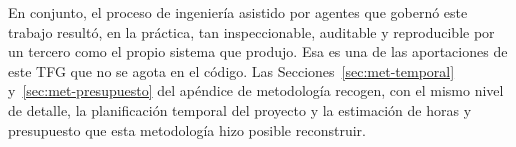 En conjunto, el proceso de ingeniería asistido por agentes que gobernó este trabajo resultó, en
la práctica, tan inspeccionable, auditable y reproducible por un tercero como el propio sistema
que produjo. Esa es una de las aportaciones de este TFG que no se agota en el código. Las
Secciones~\ref{sec:met-temporal} y~\ref{sec:met-presupuesto} del apéndice de metodología
recogen, con el mismo nivel de detalle, la planificación temporal del proyecto y la estimación
de horas y presupuesto que esta metodología hizo posible reconstruir.
